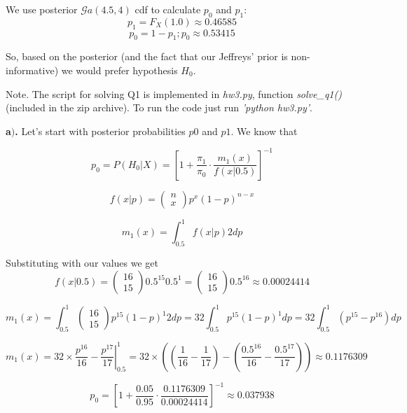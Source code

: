 \documentclass[a4 paper]{article}
\begin{document}
We use posterior $\mathcal{G}a\left(4.5,4\right)$ cdf 
to calculate $p_0$ and $p_1$:
$$
p_{1}=F_{X}(1.0)\approx0.46585
$$
$$
p_{0}=1-p_{1};p_{0}\approx0.53415
$$

So, based on the posterior (and the 
fact that our Jeffreys' prior is non-informative)
we would prefer hypothesis $H_0$. \newline


Note. The script for solving Q1 is implemented in 
\textit{hw3.py}, function \textit{solve\_q1()} 
(included in the zip archive). To run the code just run 
\textit{'python hw3.py'}. 





\textbf{a$)$.} Let's start with posterior probabilities 
$p0$ and $p1$. We know that

$$
p_{0}=P\left(H_{0} | X\right)=\left[1+\frac{\pi_{1}}{\pi_{0}} \cdot \frac{m_{1}(x)}{f(x | 0.5)}\right]^{-1}
$$

$$
f(x | p)=\left(\begin{array}{l}
{n} \\
{x}
\end{array}\right) p^{x}(1-p)^{n-x}
$$

$$
m_{1}(x)=\int_{0.5}^{1} f(x | p) 2 d p
$$

Substituting with our values we get
$$
f(x|0.5)=\left(\begin{array}{l}
16\\
15
\end{array}\right)0.5^{15}0.5^{1}=\left(\begin{array}{l}
16\\
15
\end{array}\right)0.5^{16}\approx 0.00024414
$$


$$
m_{1}(x)=\int_{0.5}^{1}\left(\begin{array}{l}
16\\
15
\end{array}\right)p^{15}(1-p)^{1}2dp=32\int_{0.5}^{1}p^{15}(1-p)^{1}dp=32\int_{0.5}^{1}\left(p^{15}-p^{16}\right)dp
$$

$$
m_{1}(x)=32\times\left.\frac{p^{16}}{16}-\frac{p^{17}}{17}\right|_{0.5}^{1}=32\times\left(\left(\frac{1}{16}-\frac{1}{17}\right)-\left(\frac{0.5^{16}}{16}-\frac{0.5^{17}}{17}\right)\right)\approx0.1176309
$$

$$
p_{0}=\left[1+\frac{0.05}{0.95}\cdot\frac{0.1176309}{0.00024414}\right]^{-1}\approx0.037938
$$
\end{document}
